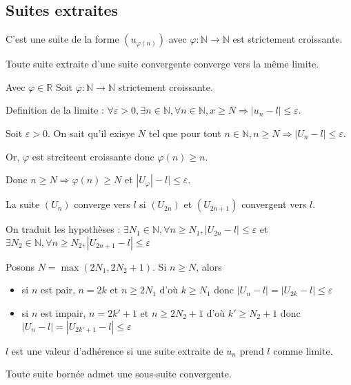 \documentclass[french]{yLectureNote}
\begin{document}
\subsection{Suites extraites}
\begin{definition}
C'est une suite de la forme $(u_{\varphi(n)})$ avec $\varphi : \mathbb{N} \to \mathbb{N}$ est strictement croissante.
\end{definition}
\begin{theorem}
 Toute suite extraite d'une suite convergente converge vers la m\^eme limite.
\end{theorem}
\begin{myproof}
Avec $\varphi \in \mathbb{R}$ Soit $\varphi : \mathbb{N} \to \mathbb{N}$ strictement croissante.

Definition de la limite : $\forall \varepsilon >0,\exists n \in \mathbb{N}, \forall n\in\mathbb{N}, x\geq N \Rightarrow |u_n-l| \leq \varepsilon$.

Soit $\varepsilon >0$. On sait qu'il exisye $N$ tel que pour tout $n\in\mathbb{N}, n\geq N \Rightarrow |U_n -l|\leq \varepsilon$.

Or, $\varphi$ est strciteent croissante donc $\varphi(n) \geq n$.

Donc $n\geq N \Rightarrow \varphi(n) \geq N$ et $|U_{\varphi}| - l| \leq \varepsilon$.
\end{myproof}
\begin{proposition}
La suite $(U_n)$ converge vers $l$ si $(U_{2n})$ et $(U_{2n+1})$ convergent vers $l$.
\end{proposition}
\begin{myproof}
On traduit les hypothèses : $\exists N_1\in\mathbb{N}, \forall n\geq N_1, |U_{2n} - l|\leq \varepsilon$ et  $\exists N_2\in\mathbb{N}, \forall n\geq N_2, |U_{2n+1} - l|\leq \varepsilon$

Posons $N = \max(2N_1,2N_2+1)$.
Si $n\geq N$, alors
\begin{itemize}
 \item si $n$ est pair, $n=2k$ et $n\geq 2N_1$ d'où $k\geq N_1$ donc $|U_n-l| = |U_{2k} - l| \leq \varepsilon$
 \item si $n$ est impair, $n=2k'+1$ et $n\geq 2N_2+1$ d'où $k'\geq N_2+1$ donc $|U_n-l| = |U_{2k'+1} - l| \leq \varepsilon$
\end{itemize}
\end{myproof}
\begin{definition}
$l$ est une valeur d'adhérence si une suite extraite de $u_n$ prend $l$ comme limite.
\end{definition}
\begin{theorem}
 Toute suite bornée admet une sous-suite convergente.
\end{theorem}
\end{document}

